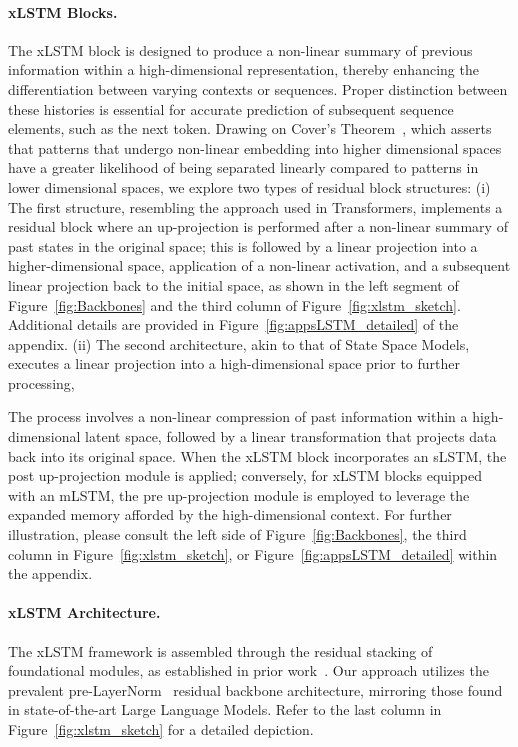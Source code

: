 \paragraph{xLSTM Blocks.}
\label{sec:xLSTMblock}
The xLSTM block is designed to produce a non-linear summary of previous information within a high-dimensional representation, thereby enhancing the differentiation between varying contexts or sequences. Proper distinction between these histories is essential for accurate prediction of subsequent sequence elements, such as the next token. Drawing on Cover’s Theorem~\citep{Cover:65}, which asserts that patterns that undergo non-linear embedding into higher dimensional spaces have a greater likelihood of being separated linearly compared to patterns in lower dimensional spaces, we explore two types of residual block structures: (i) The first structure, resembling the approach used in Transformers, implements a residual block where an up-projection is performed after a non-linear summary of past states in the original space; this is followed by a linear projection into a higher-dimensional space, application of a non-linear activation, and a subsequent linear projection back to the initial space, as shown in the left segment of Figure~\ref{fig:Backbones} and the third column of Figure~\ref{fig:xlstm_sketch}. Additional details are provided in Figure~\ref{fig:appsLSTM_detailed} of the appendix. (ii) The second architecture, akin to that of State Space Models, executes a linear projection into a high-dimensional space prior to further processing,

The process involves a non-linear compression of past information within a high-dimensional latent space, followed by a linear transformation that projects data back into its original space. When the xLSTM block incorporates an sLSTM, the post up-projection module is applied; conversely, for xLSTM blocks equipped with an mLSTM, the pre up-projection module is employed to leverage the expanded memory afforded by the high-dimensional context. For further illustration, please consult the left side of Figure~\ref{fig:Backbones}, the third column in Figure~\ref{fig:xlstm_sketch}, or Figure~\ref{fig:appsLSTM_detailed} within the appendix.

\paragraph{xLSTM Architecture. }
\label{sec:xLSTMarchitecure}
The xLSTM framework is assembled through the residual stacking of foundational modules, as established in prior work~\citep{Srivastava:15,He:16}. Our approach utilizes the prevalent pre-LayerNorm~\citep{Ba:16b} residual backbone architecture, mirroring those found in state-of-the-art Large Language Models. Refer to the last column in Figure~\ref{fig:xlstm_sketch} for a detailed depiction.

